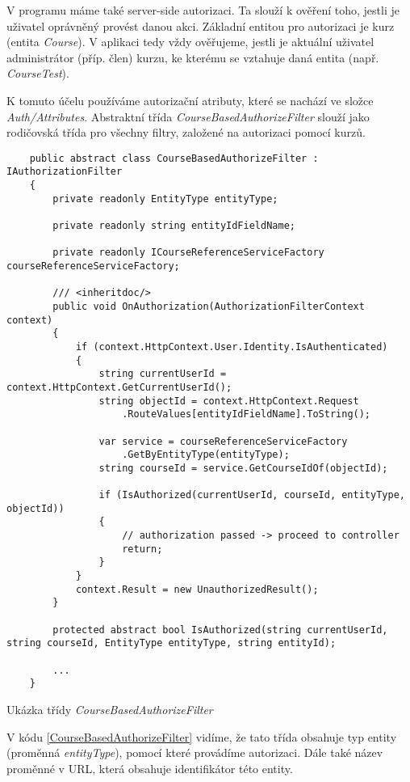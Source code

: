 V programu máme také server-side autorizaci. Ta slouží k ověření toho, jestli je uživatel oprávněný provést danou akci. Základní entitou pro autorizaci je kurz (entita \textit{Course}). V aplikaci tedy vždy ověřujeme, jestli je aktuální uživatel administrátor (příp. člen) kurzu, ke kterému se vztahuje daná entita (např. \textit{CourseTest}).

K tomuto účelu používáme autorizační atributy, které se nachází ve složce \textit{Auth/Attributes}. 
Abstraktní třída \textit{CourseBasedAuthorizeFilter} slouží jako rodičovská třída pro všechny filtry, založené na autorizaci pomocí kurzů.

\begin{program}
	\begin{lstlisting}
	public abstract class CourseBasedAuthorizeFilter : IAuthorizationFilter
	{
		private readonly EntityType entityType;
		
		private readonly string entityIdFieldName;
		
		private readonly ICourseReferenceServiceFactory courseReferenceServiceFactory;
	
		/// <inheritdoc/>
		public void OnAuthorization(AuthorizationFilterContext context)
		{
			if (context.HttpContext.User.Identity.IsAuthenticated)
			{
				string currentUserId = context.HttpContext.GetCurrentUserId();
				string objectId = context.HttpContext.Request
					.RouteValues[entityIdFieldName].ToString();
				
				var service = courseReferenceServiceFactory
					.GetByEntityType(entityType);
				string courseId = service.GetCourseIdOf(objectId);
				
				if (IsAuthorized(currentUserId, courseId, entityType, objectId))
				{
					// authorization passed -> proceed to controller
					return;
				}			
			}
			context.Result = new UnauthorizedResult();
		}
		
		protected abstract bool IsAuthorized(string currentUserId, string courseId, EntityType entityType, string entityId);
		
		...
	}
	\end{lstlisting}
	\caption{Ukázka třídy \textit{CourseBasedAuthorizeFilter}}
	\label{CourseBasedAuthorizeFilter}
\end{program}

V kódu \ref{CourseBasedAuthorizeFilter} vidíme, že tato třída obsahuje typ entity (proměnná \textit{entityType}), pomocí které provádíme autorizaci. Dále také název proměnné v URL, která obsahuje identifikátor této entity. 

